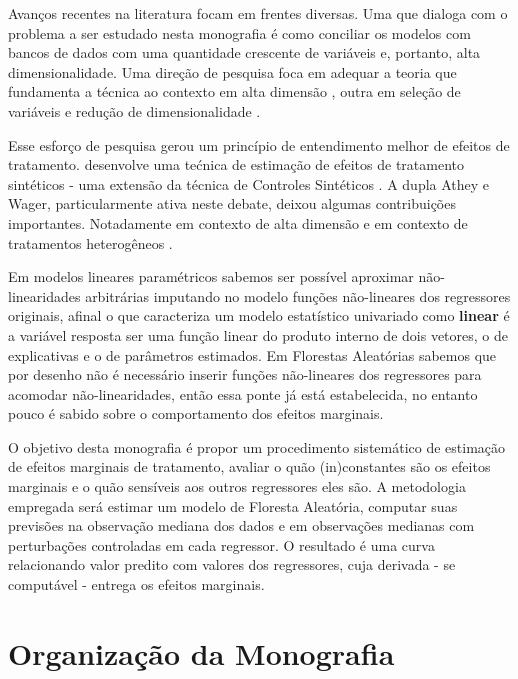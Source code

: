 Avanços recentes na literatura focam em frentes diversas. Uma que dialoga com o problema a ser estudado nesta monografia é como conciliar os modelos com bancos de dados com uma quantidade crescente de variáveis e, portanto, alta dimensionalidade. Uma direção de pesquisa foca em adequar a teoria que fundamenta a técnica ao contexto em alta dimensão \cite{athey2019generalized}, outra em seleção de variáveis e redução de dimensionalidade \cite{hastie2015statistical}. 

Esse esforço de pesquisa gerou um princípio de entendimento melhor de efeitos de tratamento.  desenvolve uma tećnica de estimação de efeitos de tratamento sintéticos - uma extensão da técnica de Controles Sintéticos \cite{abadie2010synthetic}. A dupla Athey e Wager, particularmente ativa neste debate, deixou algumas contribuições importantes. Notadamente em contexto de alta dimensão \cite{athey2018approximate} e em contexto de tratamentos heterogêneos \cite{wager2018estimation}. 

Em modelos lineares paramétricos sabemos ser possível aproximar não-linearidades arbitrárias imputando no modelo funções não-lineares dos regressores originais, afinal o que caracteriza um modelo estatístico univariado como \textbf{linear} é a variável resposta ser uma função linear do produto interno de dois vetores, o de explicativas e o de parâmetros estimados. Em Florestas Aleatórias sabemos que por desenho não é necessário inserir funções não-lineares dos regressores para acomodar não-linearidades, então essa ponte já está estabelecida, no entanto pouco é sabido sobre o comportamento dos efeitos marginais.

O objetivo desta monografia é propor um procedimento sistemático de estimação de efeitos marginais de tratamento, avaliar o quão (in)constantes são os efeitos marginais e o quão sensíveis aos outros regressores eles são. A metodologia empregada será estimar um modelo de Floresta Aleatória, computar suas previsões na observação mediana dos dados e em observações medianas com perturbações controladas em cada regressor. O resultado é uma curva relacionando valor predito com valores dos regressores, cuja derivada - se computável - entrega os efeitos marginais.


 
 \section{Organização da Monografia}
 
